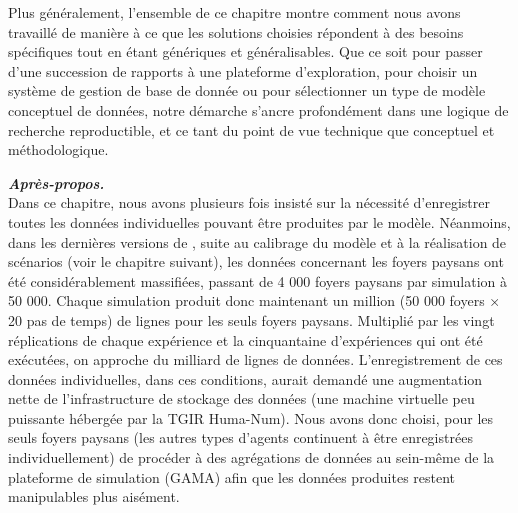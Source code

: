 Plus généralement, l'ensemble de ce chapitre montre comment nous avons travaillé de manière à ce que les solutions choisies répondent à des besoins spécifiques tout en étant génériques et généralisables.
Que ce soit pour passer d'une succession de rapports à une plateforme d'exploration, pour choisir un système de gestion de base de donnée ou pour sélectionner un type de modèle conceptuel de données, notre démarche s'ancre profondément dans une logique de recherche reproductible, et ce tant du point de vue technique que conceptuel et méthodologique.


\vfill
{}
\begin{mdframed}[backgroundcolor=black!5,footnoteinside=false]
	\textbf{\textit{Après-propos.}}\\
{\small
Dans ce chapitre, nous avons plusieurs fois insisté sur la nécessité d'enregistrer toutes les données individuelles pouvant être produites par le modèle.
Néanmoins, dans les dernières versions de \simfeodal{}, suite au calibrage du modèle et à la réalisation de scénarios (voir le chapitre suivant), les données concernant les foyers paysans ont été considérablement massifiées, passant de 4 000 foyers paysans par simulation à 50 000.
Chaque simulation produit donc maintenant un million (50 000 foyers × 20 pas de temps) de lignes pour les seuls foyers paysans.
Multiplié par les vingt réplications de chaque expérience et la cinquantaine d'expériences qui ont été exécutées, on approche du milliard de lignes de données.
L'enregistrement de ces données individuelles, dans ces conditions, aurait demandé une augmentation nette de l'infrastructure de stockage des données (une machine virtuelle peu puissante hébergée par la TGIR Huma-Num).
Nous avons donc choisi, pour les seuls foyers paysans (les autres types d'agents continuent à être enregistrées individuellement) de procéder à des agrégations de données au sein-même de la plateforme de simulation (GAMA) afin que les données produites restent manipulables plus aisément.
}
\end{mdframed}